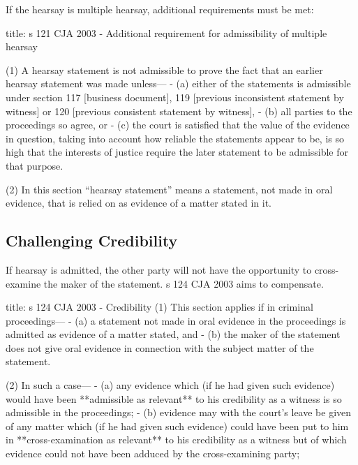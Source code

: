 \documentclass[
]{article}
\newenvironment{Shaded}{}{}
\newcommand{\NormalTok}[1]{#1}
\begin{document}
If the hearsay is multiple hearsay, additional requirements must be met:

\begin{Shaded}
\begin{Highlighting}[]
\NormalTok{title: s 121 CJA 2003 {-} Additional requirement for admissibility of multiple hearsay}

\NormalTok{(1) A hearsay statement is not admissible to prove the fact that an earlier hearsay statement was made unless—}
\NormalTok{{-} (a) either of the statements is admissible under section 117 [business document], 119 [previous inconsistent statement by witness] or 120 [previous consistent statement by witness],}
\NormalTok{{-} (b) all parties to the proceedings so agree, or}
\NormalTok{{-} (c) the court is satisfied that the value of the evidence in question, taking into account how reliable the statements appear to be, is so high that the interests of justice require the later statement to be admissible for that purpose.}

\NormalTok{(2) In this section “hearsay statement” means a statement, not made in oral evidence, that is relied on as evidence of a matter stated in it.}
\end{Highlighting}
\end{Shaded}

\hypertarget{challenging-credibility}{%
\subsection{Challenging Credibility}\label{challenging-credibility}}

If hearsay is admitted, the other party will not have the opportunity to
cross-examine the maker of the statement. s 124 CJA 2003 aims to
compensate.

\begin{Shaded}
\begin{Highlighting}[]
\NormalTok{title: s 124 CJA 2003 {-} Credibility}
\NormalTok{(1) This section applies if in criminal proceedings—}
\NormalTok{{-} (a) a statement not made in oral evidence in the proceedings is admitted as evidence of a matter stated, and}
\NormalTok{{-} (b) the maker of the statement does not give oral evidence in connection with the subject matter of the statement.}

\NormalTok{(2) In such a case—}
\NormalTok{{-} (a) any evidence which (if he had given such evidence) would have been **admissible as relevant** to his credibility as a witness is so admissible in the proceedings;}
\NormalTok{{-} (b) evidence may with the court’s leave be given of any matter which (if he had given such evidence) could have been put to him in **cross{-}examination as relevant** to his credibility as a witness but of which evidence could not have been adduced by the cross{-}examining party;}
\end{Highlighting}
\end{Shaded}
\end{document}
